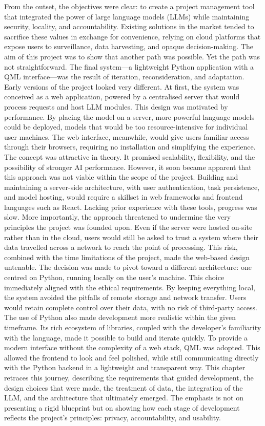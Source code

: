 \documentclass{report}
\begin{document}
From the outset, the objectives were clear: to create a project management tool that integrated the power of large language models (LLMs) while maintaining security, locality, and accountability. Existing solutions in the market tended to sacrifice these values in exchange for convenience, relying on cloud platforms that expose users to surveillance, data harvesting, and opaque decision-making. The aim of this project was to show that another path was possible.
Yet the path was not straightforward. The final system—a lightweight Python application with a QML interface—was the result of iteration, reconsideration, and adaptation. Early versions of the project looked very different. At first, the system was conceived as a web application, powered by a centralised server that would process requests and host LLM modules. This design was motivated by performance. By placing the model on a server, more powerful language models could be deployed, models that would be too resource-intensive for individual user machines. The web interface, meanwhile, would give users familiar access through their browsers, requiring no installation and simplifying the experience.
The concept was attractive in theory. It promised scalability, flexibility, and the possibility of stronger AI performance. However, it soon became apparent that this approach was not viable within the scope of the project. Building and maintaining a server-side architecture, with user authentication, task persistence, and model hosting, would require a skillset in web frameworks and frontend languages such as React. Lacking prior experience with these tools, progress was slow. More importantly, the approach threatened to undermine the very principles the project was founded upon. Even if the server were hosted on-site rather than in the cloud, users would still be asked to trust a system where their data travelled across a network to reach the point of processing. This risk, combined with the time limitations of the project, made the web-based design untenable.
The decision was made to pivot toward a different architecture: one centred on Python, running locally on the user's machine. This choice immediately aligned with the ethical requirements. By keeping everything local, the system avoided the pitfalls of remote storage and network transfer. Users would retain complete control over their data, with no risk of third-party access. The use of Python also made development more realistic within the given timeframe. Its rich ecosystem of libraries, coupled with the developer's familiarity with the language, made it possible to build and iterate quickly. To provide a modern interface without the complexity of a web stack, QML was adopted. This allowed the frontend to look and feel polished, while still communicating directly with the Python backend in a lightweight and transparent way.
This chapter retraces this journey, describing the requirements that guided development, the design choices that were made, the treatment of data, the integration of the LLM, and the architecture that ultimately emerged. The emphasis is not on presenting a rigid blueprint but on showing how each stage of development reflects the project's principles: privacy, accountability, and usability.
\end{document}
